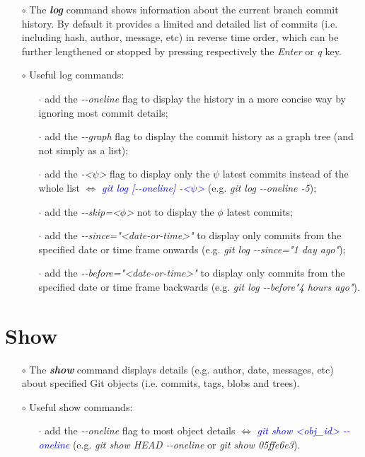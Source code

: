 \documentclass[a4paper,portrait,10pt]{article}   %
\newcommand{\mybulletlvA}{$\circ$}   %
\newcommand{\mybulletlvB}{$\cdot$}   %
\newcommand{\mydiv}{$\Leftrightarrow$ }   %
\newcommand{\mycmd}[1]{\textcolor{blue}{\textit{#1}}}   %
\newcommand{\myparvspace}{\vspace{4mm}}   %
\newcommand{\mysecvspace}{\vspace{6mm}}   %
\begin{document}
\begin{itemize}
\item[\mybulletlvA] The \textbf{\textit{log}} command shows information about the current branch commit history. By default it provides a limited and detailed list of commits (i.e. including hash, author, message, etc) in reverse time order, which can be further lengthened or stopped by pressing respectively the \textit{Enter} or \textit{q} key.
\myparvspace

\item[\mybulletlvA] Useful log commands:
\begin{itemize}
  \item[\mybulletlvB] add the \textit{-{}-oneline} flag to display the history in a more concise way by ignoring most commit details;
  \item[\mybulletlvB] add the \textit{-{}-graph} flag to display the commit history as a graph tree (and not simply as a list);
  \item[\mybulletlvB] add the \textit{-<$\psi$>} flag to display only the $\psi$ latest commits instead of the whole list \mydiv \mycmd{git log [-{}-oneline] -<$\psi$>} (e.g. \textit{git log -{}-oneline -5});
  \item[\mybulletlvB] add the \textit{-{}-skip=<$\phi$>} not to display the $\phi$ latest commits;
  \item[\mybulletlvB] add the \textit{-{}-since="<date-or-time>"} to display only commits from the specified date or time frame onwards (e.g. \textit{git log -{}-since="1 day ago"});
  \item[\mybulletlvB] add the \textit{-{}-before="<date-or-time>"} to display only commits from the specified date or time frame backwards (e.g. \textit{git log -{}-before"4 hours ago"}).
\end{itemize}
\end{itemize}
\mysecvspace


\section{Show}   \label{sec:Show}

\begin{itemize}
\item[\mybulletlvA] The \textbf{\textit{show}} command displays details (e.g. author, date, messages, etc) about specified Git objects (i.e. commits, tags, blobs and trees).
\myparvspace

\item[\mybulletlvA] Useful show commands:
\begin{itemize}
  \item[\mybulletlvB] add the \textit{-{}-oneline} flag to most object details \mydiv \mycmd{git show <obj\_id> -{}-oneline} (e.g. \textit{git show HEAD -{}-oneline} or \textit{git show 05ffe6e3}).
\end{itemize}
\end{itemize}
\mysecvspace
\end{document}
